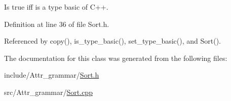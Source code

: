 Is true iff is a type basic of C++. 



Definition at line 36 of file Sort.h.

Referenced by copy(), is\_\-type\_\-basic(), set\_\-type\_\-basic(), and Sort().

The documentation for this class was generated from the following files:\begin{CompactItemize}
\item 
include/Attr\_\-grammar/\hyperlink{Sort_8h}{Sort.h}\item 
src/Attr\_\-grammar/\hyperlink{Sort_8cpp}{Sort.cpp}\end{CompactItemize}
